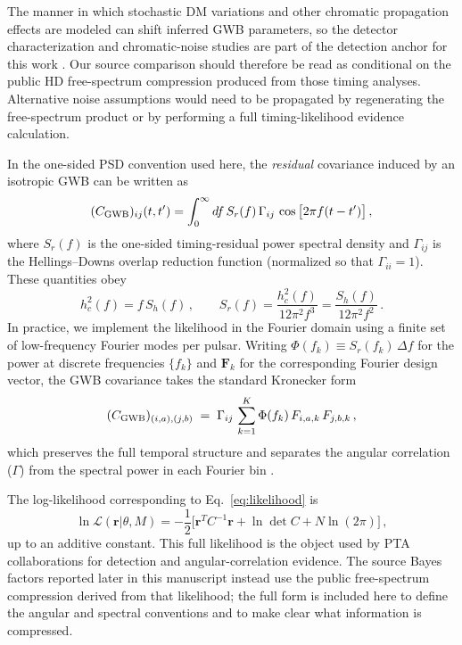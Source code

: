 \documentclass[symmetry,article,submit,pdftex,moreauthors]{Definitions/mdpi}
\begin{document}
The manner in which stochastic DM variations and other chromatic propagation effects are modeled can shift inferred GWB parameters, so the detector characterization and chromatic-noise studies are part of the detection anchor for this work \cite{Agazie2023Noise,Larsen2024}. Our source comparison should therefore be read as conditional on the public HD free-spectrum compression produced from those timing analyses. Alternative noise assumptions would need to be propagated by regenerating the free-spectrum product or by performing a full timing-likelihood evidence calculation.

In the one-sided PSD convention used here, the \emph{residual} covariance induced by an isotropic GWB can be written as
\begin{equation}\label{eq:cov_gwb}
    (C_{\rm GWB})_{ij}(t,t') = \int_{0}^{\infty} df\, S_{r}(f)\, \Gamma_{ij} \, \cos\big[2\pi f (t - t')\big] \, ,
\end{equation}
where $S_{r}(f)$ is the one-sided timing-residual power spectral density and $\Gamma_{ij}$ is the Hellings--Downs overlap reduction function (normalized so that $\Gamma_{ii}=1$). These quantities obey
\begin{equation}\label{eq:hc_sr}
  h_c^2(f) = f\,S_h(f)\,,\qquad S_{r}(f) = \frac{h_c^2(f)}{12\pi^2 f^3} = \frac{S_h(f)}{12\pi^2 f^2}\,.
\end{equation}
In practice, we implement the likelihood in the Fourier domain using a finite set of low-frequency Fourier modes per pulsar. Writing $\Phi(f_k) \equiv S_{r}(f_k)\,\Delta f$ for the power at discrete frequencies $\{f_k\}$ and $\mathbf{F}_k$ for the corresponding Fourier design vector, the GWB covariance takes the standard Kronecker form
\begin{equation}
  (C_{\rm GWB})_{(i,a),(j,b)} \;=\; \Gamma_{ij}\, \sum_{k=1}^{K} \Phi(f_k)\, F_{i,a,k}\,F_{j,b,k}\, ,
\end{equation}
which preserves the full temporal structure and separates the angular correlation ($\Gamma$) from the spectral power in each Fourier bin \cite{NANOGrav15-Methods}.

The log-likelihood corresponding to Eq.~\eqref{eq:likelihood} is 
\begin{equation}
    \ln \mathcal{L}(\mathbf{r}|\theta, M) = -\frac{1}{2}\Big[\mathbf{r}^T C^{-1} \mathbf{r} + \ln\det C + N\ln(2\pi)\Big]\,,
\end{equation}
up to an additive constant. This full likelihood is the object used by PTA collaborations for detection and angular-correlation evidence. The source Bayes factors reported later in this manuscript instead use the public free-spectrum compression derived from that likelihood; the full form is included here to define the angular and spectral conventions and to make clear what information is compressed.
\end{document}

